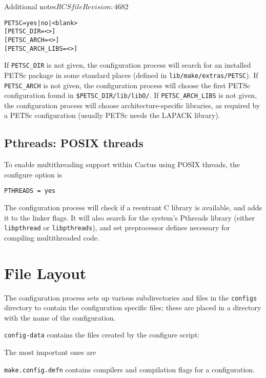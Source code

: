 \begin{cactuspart}{Additional notes}{$RCSfile$}{$Revision: 4682 $}
\begin{alltt}
PETSC = yes | no | <blank>
[ PETSC\_DIR = <> ]
[ PETSC\_ARCH = <> ]
[ PETSC\_ARCH\_LIBS = <> ]
\end{alltt}

If \texttt{PETSC\_DIR} is not given, the configuration process will search for an
installed PETSc package in some standard places (defined in
\texttt{lib/make/extras/PETSC}).
If \texttt{PETSC\_ARCH} is not given, the configuration process will choose the
first PETSc configuration found in \texttt{\$PETSC\_DIR/lib/libO/}.
If \texttt{PETSC\_ARCH\_LIBS} is not given, the configuration process will choose
architecture-specific libraries, as required by a PETSc configuration (usually
PETSc needs the LAPACK library).


\subsection{Pthreads: POSIX threads}

To enable multithreading support within Cactus using POSIX threads,
the configure option is

\texttt{PTHREADS = yes}

The configuration process will check if a reentrant C library is available,
and adds it to the linker flags. It will also search for the system's Pthreads
library (either \texttt{libpthread} or \texttt{libpthreads}), and set
preprocessor defines necessary for compiling multithreaded code.


\section{File Layout}

The configuration process sets up various subdirectories and files in the
\texttt{configs} directory to contain the configuration specific files; these
are placed in a directory with the name of the configuration.

\begin{Lentry}

\item [\texttt{config-data}] contains the files created by the configure
script:

The most important ones are

\begin{Lentry}

\item [\texttt{make.config.defn}]
contains compilers and compilation flags for a configuration.


\end{Lentry}
\end{Lentry}
\end{cactuspart}
